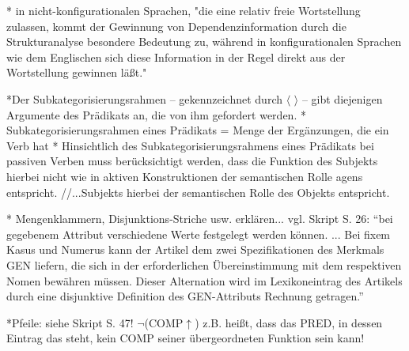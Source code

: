 \documentclass[12pt,a4paper]{article}
\begin{document}
* in nicht-konfigurationalen Sprachen, "die eine
relativ freie Wortstellung zulassen, kommt der Gewinnung von
Dependenzinformation durch die Strukturanalyse besondere
Bedeutung zu, während in konfigurationalen Sprachen wie dem Englischen sich
diese Information in der Regel direkt aus der Wortstellung gewinnen läßt."

*Der Subkategorisierungsrahmen -- gekennzeichnet durch $\langle$ $\rangle$ -- gibt diejenigen Argumente des Prädikats an, die von ihm gefordert werden.
* Subkategorisierungsrahmen eines Prädikats = Menge der Ergänzungen, die ein Verb hat
* Hinsichtlich des Subkategorisierungsrahmens eines Prädikats bei passiven Verben muss berücksichtigt werden, dass die Funktion des Subjekts hierbei nicht wie in aktiven Konstruktionen der semantischen Rolle agens entspricht. //...Subjekts hierbei der semantischen Rolle des Objekts entspricht.

* Mengenklammern, Disjunktions-Striche usw. erklären... vgl. Skript S. 26: ``bei gegebenem Attribut verschiedene Werte festgelegt werden können. ... Bei fixem Kasus und Numerus kann der Artikel dem zwei Spezifikationen des Merkmals GEN
liefern, die sich in der erforderlichen Übereinstimmung mit dem respektiven Nomen bewähren
müssen. Dieser Alternation wird im Lexikoneintrag des Artikels durch eine disjunktive
Definition des GEN-Attributs Rechnung getragen.''

*Pfeile: siehe Skript S. 47! $\neg$(COMP$\uparrow$) z.B. heißt, dass das PRED, in dessen Eintrag das steht, kein COMP seiner übergeordneten Funktion sein kann!
\end{document}
